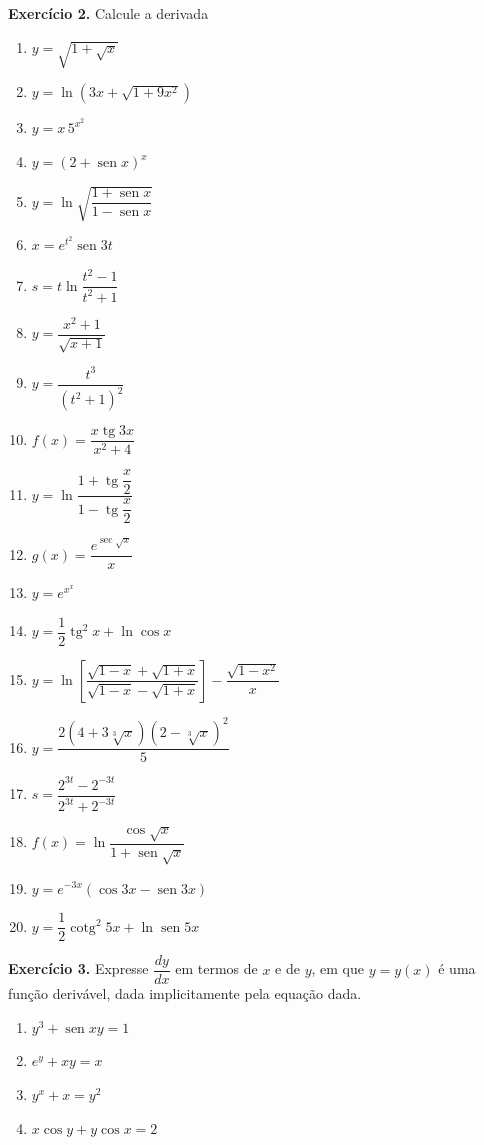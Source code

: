 \documentclass[12pt,a4paper]{article}
\begin{document}
\vspace{0.5cm}
\noindent\textbf{Exercício 2.} Calcule a derivada
\begin{enumerate}
    \renewcommand{\theenumi}{\alph{enumi}}
    \renewcommand{\labelenumi}{\theenumi)}
    \item $y = \sqrt{1 + \sqrt{x}}$
    \item $y = \ln(3x + \sqrt{1 + 9x^2})$
    \item $y = x\,5^{x^2}$
    \item $y = (2 + \operatorname{sen} x)^x$
    \item $y = \ln\sqrt{\dfrac{1 + \operatorname{sen} x}{1 - \operatorname{sen} x}}$
    \item $x = e^{t^2}\operatorname{sen} 3t$
    \item $s = t\ln\dfrac{t^2 - 1}{t^2 + 1}$
    \item $y = \dfrac{x^2 + 1}{\sqrt{x + 1}}$
    \item $y = \dfrac{t^3}{(t^2 + 1)^2}$
    \item $f(x) = \dfrac{x\operatorname{tg} 3x}{x^2 + 4}$
    \item $y = \ln\dfrac{1 + \operatorname{tg}\dfrac{x}{2}}{1 - \operatorname{tg}\dfrac{x}{2}}$
    \item $g(x) = \dfrac{e^{\sec\sqrt{x}}}{x}$
    \item $y = e^{x^x}$
    \item $y = \dfrac{1}{2}\operatorname{tg}^2 x + \ln\cos x$
    \item $y = \ln\!\left[\dfrac{\sqrt{1 - x} + \sqrt{1 + x}}{\sqrt{1 - x} - \sqrt{1 + x}}\right] - \dfrac{\sqrt{1 - x^2}}{x}$
    \item $y = \dfrac{2(4 + 3\sqrt[3]{x})(2 - \sqrt[3]{x})^2}{5}$
    \item $s = \dfrac{2^{3t} - 2^{-3t}}{2^{3t} + 2^{-3t}}$
    \item $f(x) = \ln\dfrac{\cos\sqrt{x}}{1 + \operatorname{sen}\sqrt{x}}$
    \item $y = e^{-3x}(\cos 3x - \operatorname{sen} 3x)$
    \item $y = \dfrac{1}{2}\operatorname{cotg}^2 5x + \ln\operatorname{sen} 5x$
\end{enumerate}

\vspace{0.5cm}
\noindent\textbf{Exercício 3.} Expresse $\dfrac{dy}{dx}$ em termos de $x$ e de $y$, em que $y = y(x)$ é uma função derivável, dada implicitamente pela equação dada.
\begin{enumerate}
    \renewcommand{\theenumi}{\alph{enumi}}
    \renewcommand{\labelenumi}{\theenumi)}
    \item $y^3 + \operatorname{sen} xy = 1$
    \item $e^y + xy = x$
    \item $y^x + x = y^2$
    \item $x\cos y + y\cos x = 2$
\end{enumerate}
\end{document}
